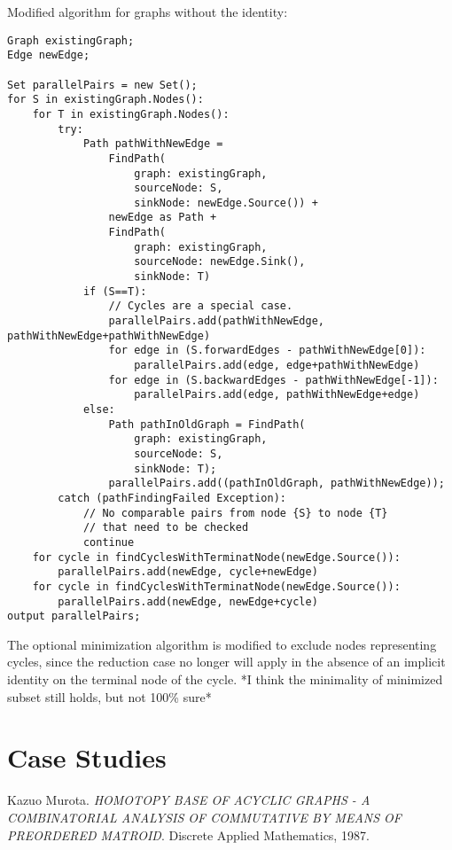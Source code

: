 \documentclass{article}
\begin{document}
Modified algorithm for graphs without the identity:

\begin{verbatim}
Graph existingGraph;
Edge newEdge;

Set parallelPairs = new Set();
for S in existingGraph.Nodes():
    for T in existingGraph.Nodes():
        try:
            Path pathWithNewEdge = 
                FindPath(
                    graph: existingGraph, 
                    sourceNode: S,
                    sinkNode: newEdge.Source()) +
                newEdge as Path +
                FindPath(
                    graph: existingGraph, 
                    sourceNode: newEdge.Sink(), 
                    sinkNode: T)
            if (S==T):
                // Cycles are a special case.
                parallelPairs.add(pathWithNewEdge, pathWithNewEdge+pathWithNewEdge)
                for edge in (S.forwardEdges - pathWithNewEdge[0]):
                    parallelPairs.add(edge, edge+pathWithNewEdge)
                for edge in (S.backwardEdges - pathWithNewEdge[-1]):
                    parallelPairs.add(edge, pathWithNewEdge+edge)
            else:
                Path pathInOldGraph = FindPath(
                    graph: existingGraph, 
                    sourceNode: S, 
                    sinkNode: T);
                parallelPairs.add((pathInOldGraph, pathWithNewEdge));
        catch (pathFindingFailed Exception):
            // No comparable pairs from node {S} to node {T} 
            // that need to be checked
            continue
    for cycle in findCyclesWithTerminatNode(newEdge.Source()):
        parallelPairs.add(newEdge, cycle+newEdge)
    for cycle in findCyclesWithTerminatNode(newEdge.Source()):
        parallelPairs.add(newEdge, newEdge+cycle)
output parallelPairs;
\end{verbatim}

The optional minimization algorithm is modified to exclude nodes representing cycles, since the reduction case no longer will apply in the absence of an implicit identity on the terminal node of the cycle.
*I think the minimality of minimized subset still holds, but not 100\% sure*

\section{Case Studies}

\begin{thebibliography}{9}
Kazuo Murota. 
\textit{HOMOTOPY BASE OF ACYCLIC GRAPHS - A COMBINATORIAL ANALYSIS OF COMMUTATIVE BY MEANS OF PREORDERED MATROID}. 
Discrete Applied Mathematics, 1987.

\end{thebibliography}
\end{document}
